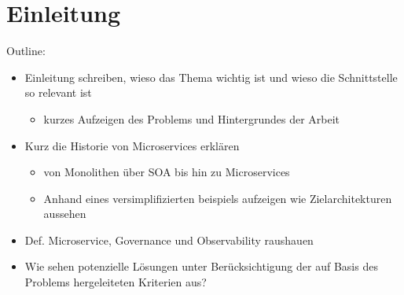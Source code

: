 \documentclass[
	12pt,
	BCOR=5mm,
	DIV=12,
	headinclude=on,
	footinclude=off,
	parskip=half,
	bibliography=totoc,
	listof=entryprefix,
	toc=listof,
	numbers=noenddot,
	plainfootsepline
]{scrreprt}
\begin{document}






\normalfont



\tableofcontents

\listoffigures

\lstlistoflistings




\clearpage
\ihead{\chaptername~\thechapter}
\ohead{\headmark}


\chapter{Einleitung}
Outline:
\begin{itemize}
	\item Einleitung schreiben, wieso das Thema wichtig ist und wieso die Schnittstelle so relevant ist
	\begin{itemize}
		\item kurzes Aufzeigen des Problems und Hintergrundes der Arbeit
	\end{itemize}
	\item Kurz die Historie von Microservices erklären
	\begin{itemize}
		\item von Monolithen über SOA bis hin zu Microservices
		\item Anhand eines versimplifizierten beispiels aufzeigen wie Zielarchitekturen aussehen
	\end{itemize}
	\item Def. Microservice, Governance und Observability raushauen
	\item Wie sehen potenzielle Lösungen unter Berücksichtigung der auf Basis des Problems hergeleiteten Kriterien aus?
\end{itemize}


\end{document}
